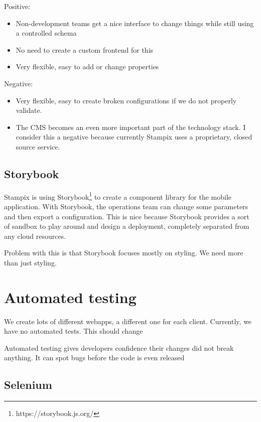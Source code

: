 Positive:

\begin{itemize}
	\item Non-development teams get a nice interface to change things while still using a controlled schema
	\item No need to create a custom frontend for this
	\item Very flexible, easy to add or change properties
\end{itemize}

Negative:

\begin{itemize}
	\item Very flexible, easy to create broken configurations if we do not properly validate.
	\item The CMS becomes an even more important part of the technology stack. I consider this a negative because currently Stampix uses a proprietary, closed source service.
\end{itemize}


\subsection{Storybook}

Stampix is using Storybook\footnote{https://storybook.js.org/} to create a component library for the mobile application. With Storybook, the operations team can change some parameters and then export a configuration.
This is nice because Storybook provides a sort of sandbox to play around and design a deployment, completely separated from any cloud resources.

Problem with this is that Storybook focuses mostly on styling. We need more than just styling.


\section{Automated testing}

We create lots of different webapps, a different one for each client. Currently, we have no automated tests. This should change

Automated testing gives developers confidence their changes did not break anything. It can spot bugs before the code is even released

\subsection{Selenium}

